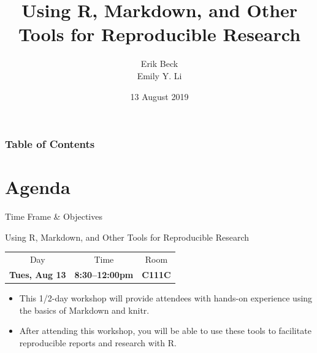 \documentclass{beamer}
\title{Using R, Markdown, and Other Tools for Reproducible Research}
\subtitle{}
\author{Erik Beck \\ Emily Y. Li}
\institute{US EPA \\ R User Group Workshop}
\date{13 August 2019}
\begin{document}
    \begin{frame}
        \maketitle
    \end{frame}

    \begin{frame}
        \frametitle{Table of Contents}
        \tableofcontents
    \end{frame}

\section{Agenda}

\begin{frame}{Time Frame \& Objectives}
\begin{exampleblock}{Using R, Markdown, and Other Tools for Reproducible Research}
\begin{center}
    \begin{tabular}{c c c}
    Day & Time & Room \\
    \textbf{Tues, Aug 13} & \textbf{8:30--12:00pm} & \textbf{C111C}
\end{tabular}
\end{center}
\end{exampleblock}

\begin{itemize}
    \item This 1/2-day workshop will provide attendees with hands-on experience
using the basics of Markdown and knitr.
    \item After attending this workshop, you will be able to use these tools to facilitate reproducible reports and research with R.
\end{itemize}
\end{frame}
\end{document}
